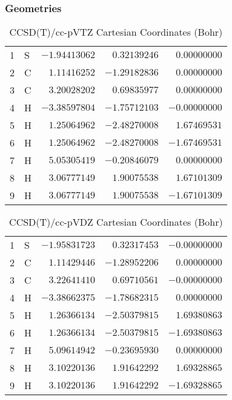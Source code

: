 \documentclass[10pt,oneside]{article}
\begin{document}
\clearpage

\subsection{\ \ \ }

\subsubsection*{Geometries}
\begin{table}[h!]
\centering
\caption{CCSD(T)/cc-pVTZ Cartesian Coordinates (Bohr)}
\begin{tabular}{llrrr}
1  & S  & $-1.94413062$ & $ 0.32139246$ & $ 0.00000000$ \\
2  & C  & $ 1.11416252$ & $-1.29182836$ & $ 0.00000000$ \\
3  & C  & $ 3.20028202$ & $ 0.69835977$ & $ 0.00000000$ \\
4  & H  & $-3.38597804$ & $-1.75712103$ & $-0.00000000$ \\
5  & H  & $ 1.25064962$ & $-2.48270008$ & $ 1.67469531$ \\
6  & H  & $ 1.25064962$ & $-2.48270008$ & $-1.67469531$ \\
7  & H  & $ 5.05305419$ & $-0.20846079$ & $ 0.00000000$ \\
8  & H  & $ 3.06777149$ & $ 1.90075538$ & $ 1.67101309$ \\
9  & H  & $ 3.06777149$ & $ 1.90075538$ & $-1.67101309$ \\
\end{tabular}
\end{table}

\begin{table}[h!]
\centering
\caption{CCSD(T)/cc-pVDZ Cartesian Coordinates (Bohr)}
\begin{tabular}{llrrr}
1  & S  & $-1.95831723$ & $ 0.32317453$ & $-0.00000000$ \\
2  & C  & $ 1.11429446$ & $-1.28952206$ & $ 0.00000000$ \\
3  & C  & $ 3.22641410$ & $ 0.69710561$ & $-0.00000000$ \\
4  & H  & $-3.38662375$ & $-1.78682315$ & $ 0.00000000$ \\
5  & H  & $ 1.26366134$ & $-2.50379815$ & $ 1.69380863$ \\
6  & H  & $ 1.26366134$ & $-2.50379815$ & $-1.69380863$ \\
7  & H  & $ 5.09614942$ & $-0.23695930$ & $ 0.00000000$ \\
8  & H  & $ 3.10220136$ & $ 1.91642292$ & $ 1.69328865$ \\
9  & H  & $ 3.10220136$ & $ 1.91642292$ & $-1.69328865$ \\
\end{tabular}
\end{table}
\end{document}

